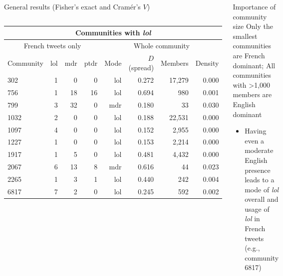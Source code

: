 \documentclass{beamer}\usepackage[]{graphicx}\usepackage[]{color}
\newcommand{\lexi}[1]{\textit{#1}}
\begin{document}
\begin{frame}
\begin{columns}[t]
\begin{block}{General results (Fisher's exact and Cramér's $V$)}
\begin{columns}[t]
\begin{center}
                \begin{tabular}{l r r r | r r r r}
                  \multicolumn{8}{c}{Communities with \lexi{lol}} \\
                  \hline
                  \multicolumn{4}{c}{French tweets only}                                                                                             & \multicolumn{4}{c}{Whole community} \\
                  Community & lol                                   & mdr                                   & ptdr                                   & Mode & $D$ (spread) & Members & Density \\
                  \hline
                  302       & 1  & 0  & 0  & lol  & 0.272        & 17,279  & 0.000\\
                  756       & 1  & 18  & 16  & lol  & 0.694        & 980     & 0.001 \\
                  799       & 3  & 32  & 0  & mdr  & 0.180        & 33      & 0.030 \\
                  1032      & 2 & 0 & 0 & lol  & 0.188        & 22,531  & 0.000 \\
                  1097      & 4 & 0 & 0 & lol  & 0.152        & 2,955   & 0.000 \\
                  1227      & 1 & 0 & 0 & lol  & 0.153        & 2,214   & 0.000 \\
                  1917      & 1 & 5 & 0 & lol  & 0.481        & 4,432   & 0.000 \\
                  2067      & 6 & 13 & 8 & mdr  & 0.616        & 44      & 0.023 \\
                  2265      & 1 & 3 & 1 & lol  & 0.440        & 242     & 0.004 \\
                  6817      & 7 & 2 & 0 & lol  & 0.245        & 592     & 0.002
                \end{tabular}
              \end{center}
          \end{columns}
        \end{block}

        \begin{block}{Importance of community size}
          Only the smallest communities are French dominant; All communities with >1,000 members are English dominant
          \begin{itemize}
            \item Having even a moderate English presence leads to a mode of \lexi{lol} overall and usage of \lexi{lol} in French tweets (e.g., community 6817)
          \end{itemize}
          \begin{columns}
              \begin{center}


\end{center}
\end{columns}
\end{block}
\end{columns}
\end{frame}
\end{document}
